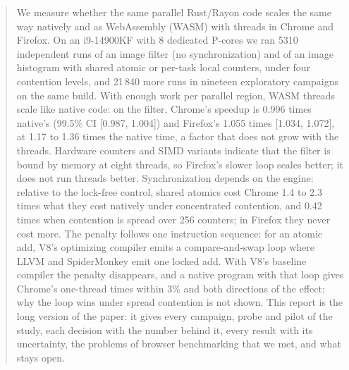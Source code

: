 \begin{abstract}
We measure whether the same parallel Rust/Rayon code scales the same way
natively and as WebAssembly (WASM) with threads in Chrome and Firefox. On an
i9-14900KF with 8 dedicated P-cores we ran 5310 independent runs of an image
filter (no synchronization) and of an image histogram with shared atomic or
per-task local counters, under four contention levels, and 21\,840 more runs
in nineteen exploratory campaigns on the same build. With enough work per
parallel region, WASM threads scale like native code: on the filter, Chrome's
speedup is 0.996 times native's (99.5\% CI [0.987, 1.004]) and Firefox's
1.055 times [1.034, 1.072], at 1.17 to 1.36 times the native time, a factor
that does not grow with the threads. Hardware counters and SIMD variants
indicate that the filter is bound by memory at eight threads, so Firefox's slower loop scales better; it
does not run threads better. Synchronization depends on the engine: relative
to the lock-free control, shared atomics cost Chrome 1.4 to 2.3 times what
they cost natively under concentrated contention, and 0.42 times when
contention is spread over 256 counters; in Firefox they never cost more.
The penalty follows one instruction sequence: for an atomic add, V8's
optimizing compiler emits a compare-and-swap loop where LLVM and
SpiderMonkey emit one locked add. With V8's baseline compiler the penalty
disappears, and a native program with that loop gives Chrome's one-thread
times within 3\% and both directions of the effect; why the loop wins under
spread contention is not shown. This report is the
long version of the paper: it gives every campaign, probe and pilot of the
study, each decision with the number behind it, every result with its
uncertainty, the problems of browser benchmarking that we met, and what
stays open.
\end{abstract}
